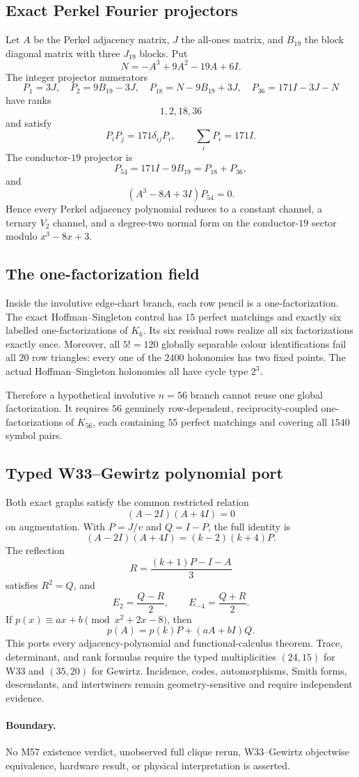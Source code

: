 \subsection{Exact Perkel Fourier projectors}
Let $A$ be the Perkel adjacency matrix, $J$ the all-ones matrix, and $B_{19}$ the block diagonal matrix with three $J_{19}$ blocks. Put
\[
N=-A^3+9A^2-19A+6I.
\]
The integer projector numerators
\[
P_1=3J,
\quad
P_2=9B_{19}-3J,
\quad
P_{18}=N-9B_{19}+3J,
\quad
P_{36}=171I-3J-N
\]
have ranks
\[
1,2,18,36
\]
and satisfy
\[
P_iP_j=171\delta_{ij}P_i,
\qquad
\sum_iP_i=171I.
\]
The conductor-$19$ projector is
\[
\boxed{P_{54}=171I-9B_{19}=P_{18}+P_{36}},
\]
and
\[
(A^3-8A+3I)P_{54}=0.
\]
Hence every Perkel adjacency polynomial reduces to a constant channel, a ternary $V_2$ channel, and a degree-two normal form on the conductor-$19$ sector modulo $x^3-8x+3$.

\subsection{The one-factorization field}
Inside the involutive edge-chart branch, each row pencil is a one-factorization. The exact Hoffman--Singleton control has $15$ perfect matchings and exactly six labelled one-factorizations of $K_6$. Its six residual rows realize all six factorizations exactly once. Moreover, all $5!=120$ globally separable colour identifications fail all $20$ row triangles: every one of the $2400$ holonomies has two fixed points. The actual Hoffman--Singleton holonomies all have cycle type $2^3$.

Therefore a hypothetical involutive $n=56$ branch cannot reuse one global factorization. It requires $56$ genuinely row-dependent, reciprocity-coupled one-factorizations of $K_{56}$, each containing $55$ perfect matchings and covering all $1540$ symbol pairs.

\subsection{Typed W33--Gewirtz polynomial port}
Both exact graphs satisfy the common restricted relation
\[
(A-2I)(A+4I)=0
\]
on augmentation. With $P=J/v$ and $Q=I-P$, the full identity is
\[
(A-2I)(A+4I)=(k-2)(k+4)P.
\]
The reflection
\[
R=\frac{(k+1)P-I-A}{3}
\]
satisfies $R^2=Q$, and
\[
E_2=\frac{Q-R}{2},
\qquad
E_{-4}=\frac{Q+R}{2}.
\]
If $p(x)\equiv ax+b\pmod{x^2+2x-8}$, then
\[
\boxed{p(A)=p(k)P+(aA+bI)Q.}
\]
This ports every adjacency-polynomial and functional-calculus theorem. Trace, determinant, and rank formulas require the typed multiplicities $(24,15)$ for W33 and $(35,20)$ for Gewirtz. Incidence, codes, automorphisms, Smith forms, descendants, and intertwiners remain geometry-sensitive and require independent evidence.

\paragraph{Boundary.}
No M57 existence verdict, unobserved full clique rerun, W33--Gewirtz objectwise equivalence, hardware result, or physical interpretation is asserted.